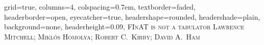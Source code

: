\documentclass[a0paper,portrait]{baposter}
\begin{document}
\begin{poster}{
    grid=true,
    columns=4,
    colspacing=0.7em,
    textborder=faded,
    headerborder=open,
    eyecatcher=true,
    headershape=rounded,
    headershade=plain,
    background=none,
    headerheight=0.09\textheight,
  }
  {
    \hfil 
  } 
  {\scshape\Large FInAT is not a tabulator}
  {\scshape\small Lawrence Mitchell; Mikl\'os Homolya; Robert C.~Kirby; David A.~Ham}
  {
  }


\end{poster}
\end{document}
